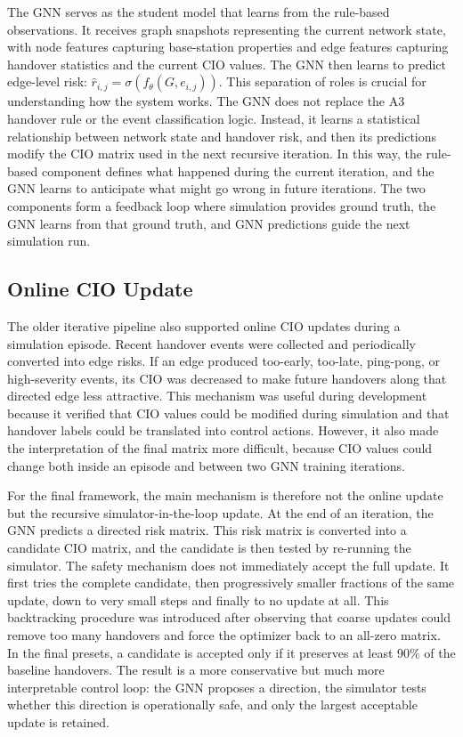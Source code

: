\documentclass[11pt,a4paper]{article}
\begin{document}
The GNN serves as the student model that learns from the rule-based observations. It receives graph snapshots representing the current network state, with node features capturing base-station properties and edge features capturing handover statistics and the current CIO values. The GNN then learns to predict edge-level risk: $\hat{r}_{i,j} = \sigma(f_\theta(G, e_{i,j}))$. This separation of roles is crucial for understanding how the system works. The GNN does not replace the A3 handover rule or the event classification logic. Instead, it learns a statistical relationship between network state and handover risk, and then its predictions modify the CIO matrix used in the next recursive iteration. In this way, the rule-based component defines what happened during the current iteration, and the GNN learns to anticipate what might go wrong in future iterations. The two components form a feedback loop where simulation provides ground truth, the GNN learns from that ground truth, and GNN predictions guide the next simulation run.

\subsection{Online CIO Update}
The older iterative pipeline also supported online CIO updates during a simulation episode. Recent handover events were collected and periodically converted into edge risks. If an edge produced too-early, too-late, ping-pong, or high-severity events, its CIO was decreased to make future handovers along that directed edge less attractive. This mechanism was useful during development because it verified that CIO values could be modified during simulation and that handover labels could be translated into control actions. However, it also made the interpretation of the final matrix more difficult, because CIO values could change both inside an episode and between two GNN training iterations.

For the final framework, the main mechanism is therefore not the online update but the recursive simulator-in-the-loop update. At the end of an iteration, the GNN predicts a directed risk matrix. This risk matrix is converted into a candidate CIO matrix, and the candidate is then tested by re-running the simulator. The safety mechanism does not immediately accept the full update. It first tries the complete candidate, then progressively smaller fractions of the same update, down to very small steps and finally to no update at all. This backtracking procedure was introduced after observing that coarse updates could remove too many handovers and force the optimizer back to an all-zero matrix. In the final presets, a candidate is accepted only if it preserves at least 90\% of the baseline handovers. The result is a more conservative but much more interpretable control loop: the GNN proposes a direction, the simulator tests whether this direction is operationally safe, and only the largest acceptable update is retained.
\end{document}

